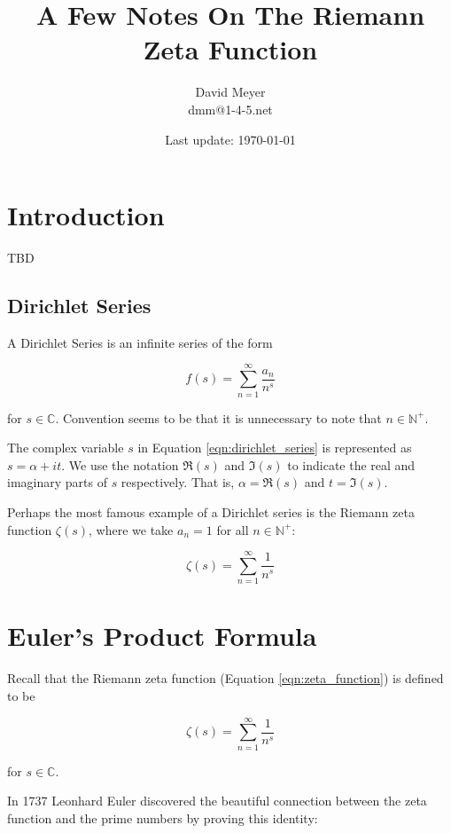 \documentclass[11pt, oneside]{article}   	%
\title{A Few Notes On The Riemann Zeta Function}
\author{David Meyer \\ dmm@1-4-5.net}
\date{Last update: \today}							%
\theoremstyle{definition}
\begin{document}
\maketitle

\section{Introduction}
TBD

\subsection{Dirichlet Series}
A Dirichlet Series \cite{mccarthy2018} is an infinite series of the form

\bigskip
\begin{equation}
f(s) = \sum\limits_{n = 1}^{\infty} \frac{a_n}{n^s}
\label{eqn:dirichlet_series}
\end{equation}

\bigskip
\noindent
for $s \in \mathbb{C}$. Convention seems to be that it is unnecessary to note that $n \in \mathbb{N}^+$.  

\bigskip
\noindent
The complex variable $s$ in Equation \ref{eqn:dirichlet_series} is represented as $s = \alpha + i t$. We use the 
notation $ \Re(s)$ and $\Im(s)$ to indicate the real and imaginary parts of $s$ respectively. That is, 
$\alpha = \Re(s)$ and $t = \Im(s)$.


\bigskip
\noindent
Perhaps the most famous example of a Dirichlet series is the Riemann zeta function $\zeta(s)$, where
we take $a_n = 1$ for all $n \in \mathbb{N}^+$:


\bigskip
\begin{equation}
\zeta(s) = \sum^\infty_{n = 1} \frac{1}{n^s}
\label{eqn:zeta_function}
\end{equation}

\bigskip
\section{Euler's Product Formula}
Recall that the Riemann zeta function (Equation \ref{eqn:zeta_function}) is defined to be

\medskip
\begin{equation*}
\zeta(s) = \sum^\infty_{n = 1} \frac{1}{n^s}
\end{equation*}

\noindent
for $s \in \mathbb{C}$.

\bigskip
\noindent
In 1737 Leonhard Euler \cite{euler_product_formula} discovered the beautiful connection between the zeta function and the prime numbers by proving this identity:
\end{document}

